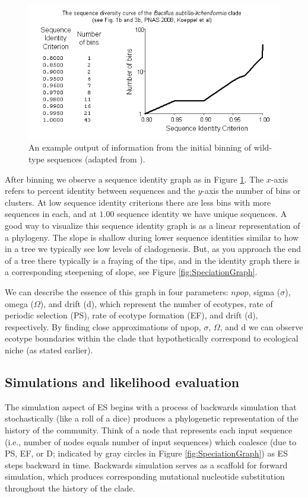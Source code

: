 \begin{figure}[h!]
 \centering
 \label{fig:Binning}
 \includegraphics[scale=1.75]{images/Binning-CH2}
 \caption[Sequence identity graph and example output produced by binning.]{An example output of information from the initial binning of wild-type sequences (adapted from \protect\cite{koeppel2008identifying}). }
  \label{fig:Binning}
\end{figure}

After binning we observe a sequence identity graph as in Figure \ref{fig:Binning}.
The $x$-axis refers to percent identity between sequences and the $y$-axis the number of bins or clusters.
At low sequence identity criterions there are less bins with more sequences in each, and at $1.00$ sequence identity we have unique sequences.
A good way to visualize this sequence identity graph is as a linear representation of a phylogeny.
The slope is shallow during lower sequence identities similar to how in a tree we typically see low levels of cladogenesis.
But, as you approach the end of a tree there typically is a fraying of the tips, and in the identity graph there is a corresponding steepening of slope, see Figure \ref{fig:SpeciationGraph}. %

We can describe the essence of this graph in four parameters: $npop$, sigma ($\sigma$), omega ($\Omega$), and drift (d), which represent the number of ecotypes, rate of periodic selection (PS), rate of ecotype formation (EF), and drift (d), respectively.
By finding close approximations of npop, $\sigma$, $\Omega$, and d we can observe ecotype boundaries within the clade that hypothetically correspond to ecological niche (as stated earlier).

\subsection*{Simulations and likelihood evaluation}
The simulation aspect of ES begins with a process of backwards simulation that stochastically (like a roll of a dice) produces a phylogenetic representation of the history of the community.
Think of a node that represents each input sequence (i.e., number of nodes equals number of input sequences) which coalesce (due to PS, EF, or D; indicated by gray circles in Figure \ref{fig:SpeciationGraph}) as ES steps backward in time.
Backwards simulation serves as a scaffold for forward simulation, which produces corresponding mutational nucleotide substitution throughout the history of the clade.

